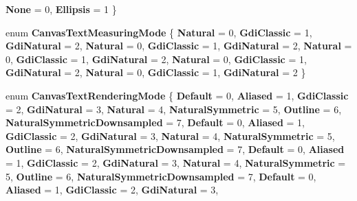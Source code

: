 \begin{DoxyCompactItemize}
\newline
{\bfseries None} = 0, 
{\bfseries Ellipsis} = 1
 \}
\item 
\mbox{\label{namespace_microsoft_1_1_graphics_1_1_canvas_1_1_text_a3496181b6d55fc9dc4eeaff916dc841f}} 
enum {\bfseries Canvas\+Text\+Measuring\+Mode} \{ \newline
{\bfseries Natural} = 0, 
{\bfseries Gdi\+Classic} = 1, 
{\bfseries Gdi\+Natural} = 2, 
{\bfseries Natural} = 0, 
\newline
{\bfseries Gdi\+Classic} = 1, 
{\bfseries Gdi\+Natural} = 2, 
{\bfseries Natural} = 0, 
{\bfseries Gdi\+Classic} = 1, 
\newline
{\bfseries Gdi\+Natural} = 2, 
{\bfseries Natural} = 0, 
{\bfseries Gdi\+Classic} = 1, 
{\bfseries Gdi\+Natural} = 2, 
\newline
{\bfseries Natural} = 0, 
{\bfseries Gdi\+Classic} = 1, 
{\bfseries Gdi\+Natural} = 2
 \}
\item 
\mbox{\label{namespace_microsoft_1_1_graphics_1_1_canvas_1_1_text_a334e63f588579a4be3880313d6dabd2d}} 
enum {\bfseries Canvas\+Text\+Rendering\+Mode} \{ \newline
{\bfseries Default} = 0, 
{\bfseries Aliased} = 1, 
{\bfseries Gdi\+Classic} = 2, 
{\bfseries Gdi\+Natural} = 3, 
\newline
{\bfseries Natural} = 4, 
{\bfseries Natural\+Symmetric} = 5, 
{\bfseries Outline} = 6, 
{\bfseries Natural\+Symmetric\+Downsampled} = 7, 
\newline
{\bfseries Default} = 0, 
{\bfseries Aliased} = 1, 
{\bfseries Gdi\+Classic} = 2, 
{\bfseries Gdi\+Natural} = 3, 
\newline
{\bfseries Natural} = 4, 
{\bfseries Natural\+Symmetric} = 5, 
{\bfseries Outline} = 6, 
{\bfseries Natural\+Symmetric\+Downsampled} = 7, 
\newline
{\bfseries Default} = 0, 
{\bfseries Aliased} = 1, 
{\bfseries Gdi\+Classic} = 2, 
{\bfseries Gdi\+Natural} = 3, 
\newline
{\bfseries Natural} = 4, 
{\bfseries Natural\+Symmetric} = 5, 
{\bfseries Outline} = 6, 
{\bfseries Natural\+Symmetric\+Downsampled} = 7, 
\newline
{\bfseries Default} = 0, 
{\bfseries Aliased} = 1, 
{\bfseries Gdi\+Classic} = 2, 
{\bfseries Gdi\+Natural} = 3, 
\newline

\end{DoxyCompactItemize}
